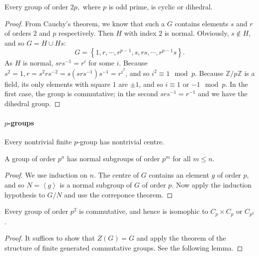 \begin{corollary}
  Every group of order \( 2p, \) where \( p \) is odd prime, is cyclic or dihedral.
\end{corollary}
\begin{proof}
  From Cauchy's theorem, we know that such a \( G \) contains elements \( s \) and \( r \) of orders \( 2 \) and \( p \) respectively.
  Then \( H \) with index \( 2 \) is normal.
  Obviously, \( s \notin H \), and so \( G = H \cup Hs \):
  \[
    G = \left\lbrace 1, r, \cdots, r^{p - 1}, s, rs, \cdots, r^{p - 1}s \right\rbrace.
  \]
  As \( H \) is normal, \( srs^{-1} = r^i \) for some \( i \).
  Because \( s^2 = 1, r= s^2 r s^{-2} = s(srs^{-1})s^{-1} = r^{i^2} \), and so \( i^2 \equiv 1 \mod{p} \).
  Because \( \mathbb{Z} / p \mathbb{Z} \) is a field, its only elements with square \( 1 \) are \( \pm 1 \), and so \( i \equiv 1 \) or \( -1 \mod{p} \).
  In the first case, the group is commutative; in the second \( s r s^{-1} = r^{-1} \) and we have the dihedral group.
\end{proof}

\paragraph{\( p \)-groups}

\begin{theorem}
  Every nontrivial finite \( p \)-group has nontrivial centre.
\end{theorem}

\begin{corollary}
  A group of order \( p^n \) has normal subgroups of order \( p^m \) for all \( m \leq n \).
\end{corollary}
\begin{proof}
  We use induction on \( n \).
  The centre of \( G \) contains an element \( g \) of order \( p \), and so \( N = \left\langle g \right\rangle \) is a normal subgroup of \( G \) of order \( p \).
  Now apply the induction hypothesis to \( G / N \) and use the correponce theorem.
\end{proof}

\begin{proposition}
  Every group of order \( p^2 \) is commutative, and hence is isomophic to \( C_p \times C_p \) or \( C_{p^2} \).
\end{proposition}
\begin{proof}
  It suffices to show that \( Z(G) = G \) and apply the theorem of the structure of finite generated commutative groups.
  See the following lemma.
\end{proof}

